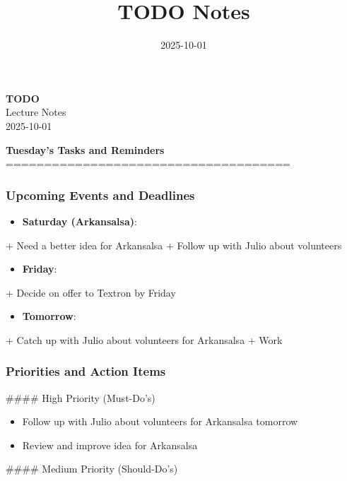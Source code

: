 \documentclass[11pt,a4paper]{article}
\title{\textcolor{primarycolor}{\Huge\textbf{TODO Notes}}}
\author{}
\date{\textcolor{secondarycolor}{2025-10-01}}
\begin{document}
\begin{center}
    \colorbox{secondarycolor!10}{%
        \parbox{0.95\textwidth}{%
            \centering
            \vspace{0.5cm}
            {\Huge\textcolor{primarycolor}{\textbf{TODO}}} \\[0.5cm]
            {\Large Lecture Notes} \\[0.3cm]
            {\large\textcolor{secondarycolor}{2025-10-01}}
            \vspace{0.5cm}
        }
    }
\end{center}

\vspace{1cm}

\textbf{Tuesday's Tasks and Reminders}
=====================================

\subsubsection*{Upcoming Events and Deadlines}

\begin{itemize}
  \item \textbf{Saturday (Arkansalsa)}:
\end{itemize}
	+ Need a better idea for Arkansalsa
	+ Follow up with Julio about volunteers
\begin{itemize}
  \item \textbf{Friday}:
\end{itemize}
	+ Decide on offer to Textron by Friday
\begin{itemize}
  \item \textbf{Tomorrow}:
\end{itemize}
	+ Catch up with Julio about volunteers for Arkansalsa
	+ Work

\subsubsection*{Priorities and Action Items}

#### High Priority (Must-Do's)

\begin{itemize}
  \item Follow up with Julio about volunteers for Arkansalsa tomorrow
  \item Review and improve idea for Arkansalsa
\end{itemize}

#### Medium Priority (Should-Do's)
\end{document}
